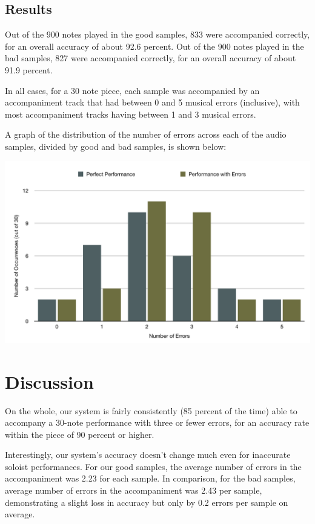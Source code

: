 \documentclass[11pt]{article}
\begin{document}
\subsection{Results}

Out of the 900 notes played in the good samples, 833 were accompanied correctly,
for an overall accuracy of about 92.6 percent. Out of the 900 notes played in the
bad samples, 827 were accompanied correctly, for an overall accuracy of about 91.9
percent.

In all cases, for a 30 note piece, each sample was accompanied by an accompaniment
track that had between 0 and 5 musical errors (inclusive), with most accompaniment
tracks having between 1 and 3 musical errors.

A graph of the distribution of the number of errors across each of the audio samples,
divided by good and bad samples, is shown below:

 \centerline{\includegraphics[scale=0.4]{graph.png}}

\section{Discussion}

On the whole, our system is fairly consistently (85 percent of the time)
able to accompany a 30-note
performance with three or fewer errors, for an accuracy rate within the piece
of 90 percent or higher.

Interestingly, our system's accuracy doesn't change much even for inaccurate
soloist performances. For our good samples, the average number of errors
in the accompaniment was 2.23 for each sample. In comparison, for the bad samples,
average number of errors in the accompaniment was 2.43 per sample, demonstrating
a slight loss in accuracy but only by 0.2 errors per sample on average.
\end{document}
